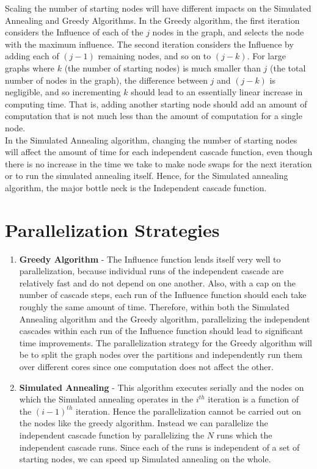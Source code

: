 \documentclass[11pt]{scrartcl} %
\begin{document}
Scaling the number of starting nodes will have different impacts on the Simulated Annealing and Greedy Algorithms. In the Greedy algorithm, the first iteration considers the Influence of each of the $j$ nodes in the graph, and selects the node with the maximum influence.  The second iteration considers the Influence by adding each of $(j-1)$ remaining nodes, and so on to $(j-k)$.  For large graphs where $k$ (the number of starting nodes) is much smaller than $j$ (the total number of nodes in the graph), the difference between $j$ and $(j-k)$ is negligible, and so incrementing $k$ should lead to an essentially linear increase in computing time.  That is, adding another starting node should add an amount of computation that is not much less than the amount of computation for a single node.\\

In the Simulated Annealing algorithm, changing the number of starting nodes will affect the amount of time for each independent cascade function, even though there is no increase in the time we take to make node swaps for the next iteration or to run the simulated annealing itself. Hence, for the Simulated annealing algorithm, the major bottle neck is the Independent cascade function. \\

\section{Parallelization Strategies}
\begin{enumerate}
\item \textbf{Greedy Algorithm} - The Influence function lends itself very well to parallelization, because individual runs of the independent cascade are relatively fast and do not depend on one another.  Also, with a cap on the number of cascade steps, each run of the Influence function should each take roughly the same amount of time.  Therefore, within both the Simulated Annealing algorithm and the Greedy algorithm, parallelizing the independent cascades within each run of the Influence function should lead to significant time improvements. The parallelization strategy for the Greedy algorithm will be to split the graph nodes over the partitions and independently run them over different cores since one computation does not affect the other.

\item \textbf{Simulated Annealing} - This algorithm executes serially and the nodes on which the Simulated annealing operates in the $i^{th}$ iteration is a function of the $(i-1)^{th}$ iteration. Hence the parallelization cannot be carried out on the nodes like the greedy algorithm. Instead we can parallelize the independent cascade function by parallelizing the $N$ runs which the independent cascade runs. Since each of the runs is independent of a set of starting nodes, we can speed up Simulated annealing on the whole.
\end{enumerate}
\end{document}
